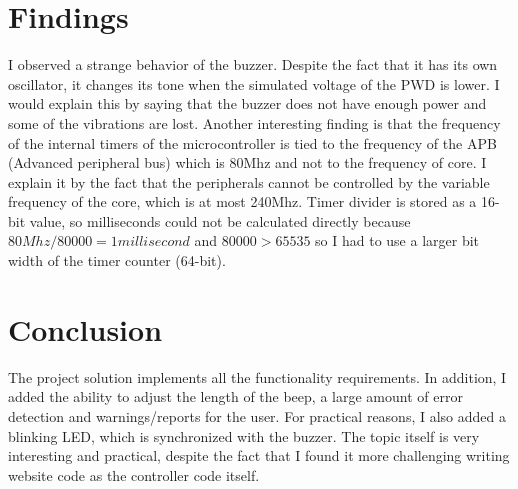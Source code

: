 \documentclass[a4paper, 11pt, twocolumn]{article}
\begin{document}
	\section{Findings}
    I observed a strange behavior of the buzzer. Despite the fact that it has its own oscillator, it changes its tone when the simulated voltage of the PWD is lower. I would explain this by saying that the buzzer does not have enough power and some of the vibrations are lost. Another interesting finding is
    that the frequency of the internal timers of the microcontroller is tied to the frequency of the APB (Advanced peripheral bus) which is 80Mhz and not to the frequency
    of core. I explain it by the fact that the peripherals cannot be controlled by the variable frequency of the core, which is at most 240Mhz. Timer divider
    is stored as a 16-bit value, so milliseconds could not be calculated directly because $80Mhz/80000 = 1 millisecond$ and $80000>65535$ so I
    had to use a larger bit width of the timer counter (64-bit).

    \section{Conclusion}
    The project solution implements all the functionality requirements. In addition, I added the ability to adjust the length of the beep, a large amount of error detection and warnings/reports for the user. For practical reasons, I also added a blinking LED, which is synchronized with the buzzer. The topic itself is very interesting and practical, despite the fact that I found it more challenging writing website code as the controller code itself.
    
\end{document}
